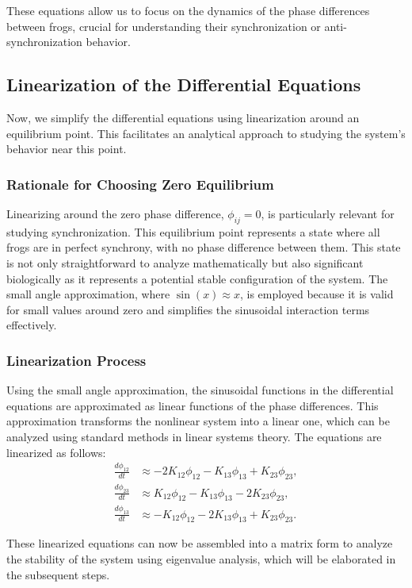 \documentclass[12pt,a4paper]{article}
\begin{document}
These equations allow us to focus on the dynamics of the phase differences between frogs, crucial for understanding their synchronization or anti-synchronization behavior.

\subsection{Linearization of the Differential Equations}

Now, we simplify the differential equations using linearization around an equilibrium point. This facilitates an analytical approach to studying the system's behavior near this point.

\subsubsection{Rationale for Choosing Zero Equilibrium}
Linearizing around the zero phase difference, \(\phi_{ij} = 0\), is particularly relevant for studying synchronization. This equilibrium point represents a state where all frogs are in perfect synchrony, with no phase difference between them. This state is not only straightforward to analyze mathematically but also significant biologically as it represents a potential stable configuration of the system. The small angle approximation, where \(\sin(x) \approx x\), is employed because it is valid for small values around zero and simplifies the sinusoidal interaction terms effectively.

\subsubsection{Linearization Process}
Using the small angle approximation, the sinusoidal functions in the differential equations are approximated as linear functions of the phase differences. This approximation transforms the nonlinear system into a linear one, which can be analyzed using standard methods in linear systems theory. The equations are linearized as follows:
\begin{align}
\frac{d\phi_{12}}{dt} &\approx -2K_{12} \phi_{12} - K_{13} \phi_{13} + K_{23} \phi_{23}, \\
\frac{d\phi_{23}}{dt} &\approx K_{12} \phi_{12} - K_{13} \phi_{13} - 2K_{23} \phi_{23}, \\
\frac{d\phi_{13}}{dt} &\approx -K_{12} \phi_{12} - 2K_{13} \phi_{13} + K_{23} \phi_{23}.
\end{align}

These linearized equations can now be assembled into a matrix form to analyze the stability of the system using eigenvalue analysis, which will be elaborated in the subsequent steps.
\end{document}
